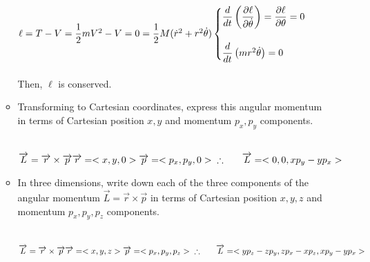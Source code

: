 \documentclass[fleqn]{article}
\begin{document}
\begin{enumerate}
\begin{itemize}
        \textcolor{hwColor}{
          $
            \ell=T-V=\dfrac{1}{2} mV^2-V=0
            \\
            \\
            =\dfrac{1}{2} M (\dot{r}^2+r^2 \dot{\theta})
            \\
            \\
            \begin{cases}
              \dfrac{d}{dt} \left(\dfrac{\partial \ell}{\partial \dot{\theta}}\right)=\dfrac{\partial \ell}{\partial \theta}=0
              \\
              \\
              \dfrac{d}{dt} \left(mr^2 \dot{\theta}\right)=0
            \end{cases}
          $
          \\
          \\
          Then, $\ell$ is conserved. 
        }

      \item Transforming to Cartesian coordinates, express this angular momentum in terms of Cartesian position
      $x, y$ and momentum $p_x, p_y$ components.

        \textcolor{hwColor}{
          \\
          $
            \overrightarrow{L}=\overrightarrow{r} \times \overrightarrow{p}
            \\
            \\
            \overrightarrow{r}=<x, y, 0>
            \\
            \\
            \overrightarrow{p}=<p_x, p_y, 0>
            \\
            \\
            \\
            \therefore ~~~~~ \overrightarrow{L}=<0, 0, x p_y-y p_x>
          $
        }

      \item In three dimensions, write down each of the three components of
      the angular momentum $\overrightarrow{L}=\overrightarrow{r} \times \overrightarrow{p}$ in terms of Cartesian position
      $x,y,z$ and momentum $p_x, p_y, p_z$ components.

        \textcolor{hwColor}{
          \\
          $
            \overrightarrow{L}=\overrightarrow{r} \times \overrightarrow{p}
            \\
            \\
            \overrightarrow{r}=<x, y, z>
            \\
            \\
            \overrightarrow{p}=<p_x, p_y, p_z>
            \\
            \\
            \\
            \therefore ~~~~~ \overrightarrow{L}=<y p_z-z p_y, z p_x-x p_z, x p_y-y p_x>
          $
        }


\end{itemize}
\end{enumerate}
\end{document}
